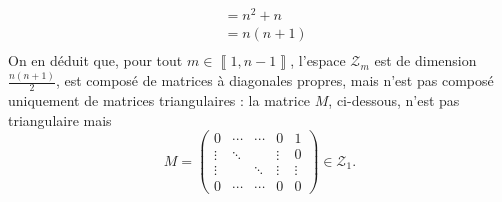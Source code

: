 \documentclass[a4paper]{article}
\begin{document}
\begin{enumerate}
\begin{align*}
				&= n^2 + n \\
				&= n(n+1) \\
			\end{align*}
			On en déduit que, pour tout $m \in \left\llbracket 1,n-1 \right\rrbracket$, l'espace $\mathcal{Z}_m$\/ est de dimension $\frac{n(n+1)}{2}$, est composé de matrices à diagonales propres, mais n'est pas composé uniquement de matrices triangulaires : la matrice $M$, ci-dessous, n'est pas triangulaire mais \[
				M = \begin{pmatrix}
					0 & \cdots & \cdots & 0 & 1\\
					\vdots & \ddots & & \vdots & 0\\
					\vdots & & \ddots & \vdots & \vdots\\
					0 & \cdots & \cdots & 0 & 0
				\end{pmatrix} \in \mathcal{Z}_1
			.\]
	\end{enumerate}
\end{document}
